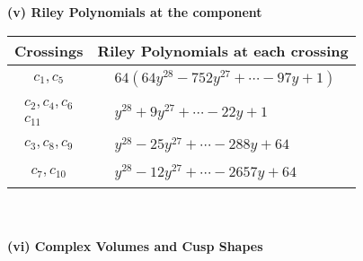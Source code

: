 \documentclass[1p]{elsarticle_modified}
\theoremstyle{definition}
\begin{document}
\newpage\renewcommand{\arraystretch}{1}
\flushleft \textbf{(v) Riley Polynomials at the component}\newline \\
\begin{tabular}{m{50pt}|m{274pt}}
Crossings & \hspace{64pt}Riley Polynomials at each crossing \\
\hline $$\begin{aligned}c_{1},c_{5}\end{aligned}$$&$\begin{aligned}
&64(64 y^{28}-752 y^{27}+\cdots-97 y+1)
\end{aligned}$\\
\hline $$\begin{aligned}c_{2},c_{4},c_{6}\\c_{11}\end{aligned}$$&$\begin{aligned}
&y^{28}+9 y^{27}+\cdots-22 y+1
\end{aligned}$\\
\hline $$\begin{aligned}c_{3},c_{8},c_{9}\end{aligned}$$&$\begin{aligned}
&y^{28}-25 y^{27}+\cdots-288 y+64
\end{aligned}$\\
\hline $$\begin{aligned}c_{7},c_{10}\end{aligned}$$&$\begin{aligned}
&y^{28}-12 y^{27}+\cdots-2657 y+64
\end{aligned}$\\
\hline
\end{tabular}\\~\\
\newpage\flushleft \textbf{(vi) Complex Volumes and Cusp Shapes}
\end{document}
